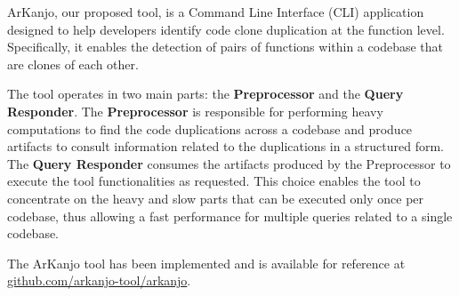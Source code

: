 \en

ArKanjo, our proposed tool, is a Command Line Interface (CLI) application designed to
help developers identify code clone duplication at the function level.
Specifically, it enables the detection of pairs of functions within a codebase
that are clones of each other.

The tool operates in two main parts: the \textbf{Preprocessor} and the \textbf{Query Responder}. 
The \textbf{Preprocessor} is responsible for performing heavy computations to find the code 
duplications across a codebase and produce artifacts to consult information related to the 
duplications in a structured form. The \textbf{Query Responder} consumes the artifacts produced 
by the Preprocessor to execute the tool functionalities as requested. This choice enables the 
tool to concentrate on the heavy and slow parts that can be executed only once per codebase, 
thus allowing a fast performance for multiple queries related to a single codebase.

The ArKanjo tool has been implemented and is available for reference at
\url{github.com/arkanjo-tool/arkanjo}.
